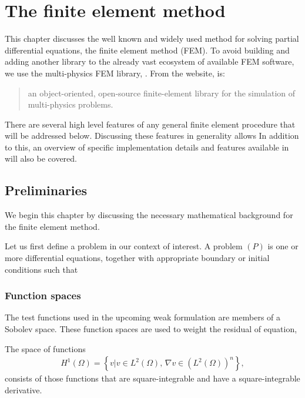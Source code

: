 \chapter{The finite element method}

This chapter discusses the well known and widely used method for solving partial differential equations, the finite element method (FEM).
To avoid building and adding another library to the already vast ecosystem of available FEM software, we use the multi-physics FEM library, \oomph.
From the website, \oomph is:
\begin{quote}
	an object-oriented, open-source finite-element library for the simulation of multi-physics problems. \cite{oomph}
\end{quote}
There are several high level features of any general finite element procedure that will be addressed below.
Discussing these features in generality allows 
In addition to this, an overview of specific implementation details and features available in \oomph will also be covered.





\section{Preliminaries}

We begin this chapter by discussing the necessary mathematical background for the finite element method.

Let us first define a problem in our context of interest.
A problem $(P)$ is one or more differential equations, together with appropriate boundary or initial conditions such that 

\iffalse WHAT DO WE NEED TO INCLUDE?

* Sobolev spaces
* Hilbert spaces 
* Banach spaces
* Norms/inner products

\fi



\subsection{Function spaces}
The test functions used in the upcoming weak formulation are members of a Sobolev space.
These function spaces are used to weight the residual of equation, 

The space of functions
\begin{align}
	H^1(\Omega) = \left\{ v | v \in L^2(\Omega), \, \nabla v \in (L^2(\Omega))^n \right\},
\end{align}
consists of those functions that are square-integrable and have a square-integrable derivative.



